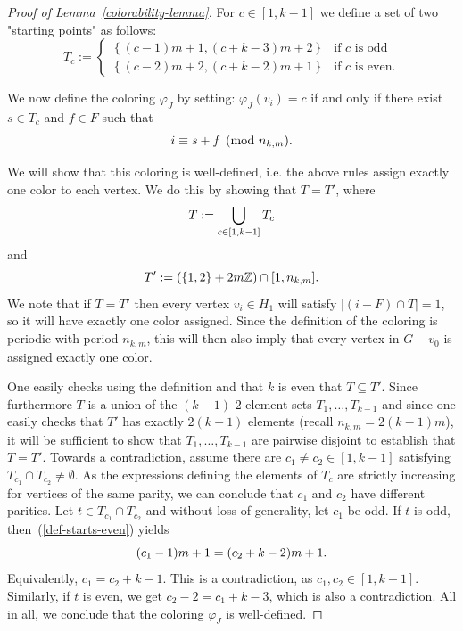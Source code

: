 \documentclass[a4paper,10pt,hidelinks]{amsart}
\theoremstyle{definition}
\begin{document}
\begin{proof}[Proof of Lemma~\ref{colorability-lemma}]
    For $c \in [1, k - 1]$ we define a set of two "starting points" as follows:
    \begin{equation}\label{def-starts-even}
    T_c := 
    \begin{cases}
        \left\{(c - 1)m + 1, (c + k - 3)m + 2\right\} & \text{if } c \text{ is odd} \\
        \left\{(c - 2)m + 2, (c + k - 2)m + 1\right\} & \text{if } c \text{ is even}.
    \end{cases}
    \end{equation}
 
    We now define the coloring $\varphi_J$ by setting: $\varphi_J(v_i) = c$ if and only if there exist $s \in T_c$ and $f \in F$ such that 
    \begin{equation}\notag
        i \equiv s + f \pmod{n_{k, m}}.
    \end{equation}

    We will show that this coloring is well-defined, i.e. the above rules assign exactly one color to each vertex. We do this by showing that $T = T'$, where
    \begin{equation}\notag
        T := \bigcup_{c \in [1, k-1]} T_c 
    \end{equation}
    and
    \begin{equation}\notag
        T' := (\{1, 2\} + 2m\mathbb{Z})\cap [1, n_{k,m}].
    \end{equation}
    We note that if $T = T'$ then every vertex $v_i \in H_1$ will satisfy $|(i - F) \cap T| = 1$, so it will have exactly one color assigned. Since the definition of the coloring is periodic with period $n_{k,m}$, this will then also imply that every vertex in $G-v_0$ is assigned exactly one color.
    
    One easily checks using the definition and that $k$ is even that $T\subseteq T'$. Since furthermore $T$ is a union of the $(k-1)$ $2$-element sets $T_1,\dots, T_{k-1}$ and since one easily checks that $T'$ has exactly $2(k-1)$ elements (recall $n_{k,m}=2(k-1)m$), it will be sufficient to show that $T_1,\dots, T_{k-1}$ are pairwise disjoint to establish that $T=T'$. Towards a contradiction, assume there are $c_1\neq c_2 \in [1, k-1]$ satisfying $T_{c_1} \cap T_{c_2} \neq \emptyset$. As the expressions defining the elements of $T_c$ are strictly increasing for vertices of the same parity, we can conclude that $c_1$ and $c_2$ have different parities. Let $t \in T_{c_1} \cap T_{c_2}$ and without loss of generality, let $c_1$ be odd. If $t$ is odd, then~(\ref{def-starts-even}) yields
    \begin{equation}\notag
        (c_1 - 1)m + 1 = (c_2 + k - 2)m + 1.
    \end{equation}
    Equivalently, $c_1 = c_2 + k - 1$. This is a contradiction, as $c_1, c_2 \in [1, k - 1]$. Similarly, if $t$ is even, we get $c_2 - 2 = c_1 + k - 3$, which is also a contradiction. All in all, we conclude that the coloring $\varphi_J$ is well-defined.


\end{proof}
\end{document}
